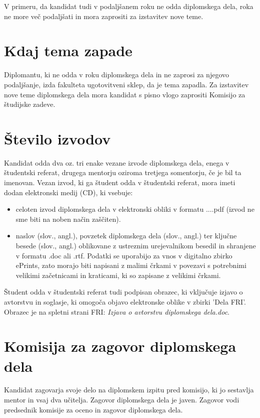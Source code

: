 \documentclass[12pt,a4paper,openany]{book}
\begin{document}
V primeru, da kandidat tudi v podaljšanem roku ne odda diplomskega dela, roka ne more več podaljšati in mora zaprositi za izstavitev nove teme.

\section{Kdaj tema zapade}
Diplomantu, ki ne odda v roku diplomskega dela in ne zaprosi za njegovo podaljšanje, izda fakulteta ugotovitveni sklep, da je tema zapadla. Za
izstavitev nove teme diplomskega dela mora kandidat s pisno vlogo zaprositi Komisijo za študijske zadeve.

\section{\v Stevilo izvodov}
Kandidat odda dva oz. tri enake vezane izvode diplomskega dela, enega v študentski referat, drugega mentorju oziroma tretjega somentorju, če je
bil ta imenovan. Vezan izvod, ki ga študent odda v študentski referat, mora imeti dodan elektronski medij (CD), ki vsebuje:
\begin{itemize}
	\item celoten izvod diplomskega dela v elektronski obliki v formatu ....pdf (izvod ne sme biti na noben način zaščiten).
	\item naslov (slov., angl.), povzetek diplomskega dela (slov., angl.) ter ključne besede (slov., angl.) oblikovane  z ustreznim urejevalnikom besedil in shranjene v formatu .doc ali .rtf. Podatki se uporabijo za vnos v digitalno zbirko ePrints, zato morajo biti napisani z malimi črkami v povezavi s potrebnimi velikimi začetnicami in kraticami, ki so zapisane z velikimi črkami. 
\end{itemize}

Študent odda v študentski referat tudi podpisan obrazec, ki vključuje izjavo o avtorstvu in soglasje, ki omogoča objavo elektronske oblike v zbirki 'Dela FRI'. Obrazec je na spletni strani FRI: \textit{Izjava o avtorstvu diplomskega dela.doc}. 


\section{Komisija za zagovor diplomskega dela}
Kandidat zagovarja svoje delo na diplomskem izpitu pred komisijo, ki jo se\-stav\-lja mentor in vsaj dva učitelja. Zagovor diplomskega dela je
javen. Zagovor vodi predsednik komisije za oceno in zagovor diplomskega dela. 
\end{document}
